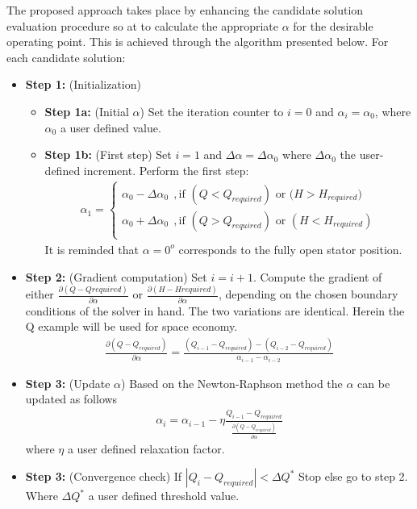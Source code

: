 The proposed approach takes place by enhancing the candidate solution evaluation procedure so at to calculate the appropriate $\alpha$ for the desirable operating point. This is achieved through the algorithm presented below. 
\newpage
For each candidate solution:
\begin{itemize}
\item[]{\bf Step 1:}  (Initialization) 
\begin{itemize}
	\item[]{\bf Step 1a:} (Initial $\alpha$) Set the iteration counter to $i=0$ and $\alpha_i=\alpha _0$, where $\alpha _0$ a user defined value.
	\item[]{\bf Step 1b:} (First step) Set $i=1$ and $\Delta \alpha= \Delta \alpha_0$ where $\Delta \alpha_0$ the user-defined increment. Perform the first step:
\begin{eqnarray}
	\alpha_1={\left\{ 
	\begin{array}{ll}
    \alpha_0 - \Delta \alpha_0 ~~,\mbox{if $(Q < Q_{required})$ or ($H > H_{required})$}\\
	\alpha_0 + \Delta \alpha_0 ~~,\mbox{if $(Q > Q_{required})$ or $(H < H_{required})$}\\
    \end{array} \right. }
    \label{step0}
\end{eqnarray}  
It is reminded that $\alpha=0^o$ corresponds to the fully open stator position.
\end{itemize}

\item[]{\bf Step 2:}  (Gradient computation) Set $i=i+1$. Compute the gradient of either $\frac{\partial(Q-Q{required})}{\partial \alpha}$ or $\frac{\partial(H-H{required})}{\partial \alpha}$, depending on the chosen boundary conditions of the solver in hand. The two variations are identical. Herein the Q example will be used for space economy. 
\begin{eqnarray}
	\frac{\partial(Q-Q_{required})}{\partial \alpha}=\frac{(Q_{i-1}-Q_{required})-(Q_{i-2}-Q_{required})}{\alpha_{i-1}- \alpha_{i-2}}
\end{eqnarray}  

\item[]{\bf Step 3:}  (Update $\alpha$) Based on the Newton-Raphson method the $\alpha$ can be updated as follows
\begin{eqnarray}
	\alpha_{i}=\alpha_{i-1} - \eta \frac{Q_{i-1}-Q_{required}} {\frac{\partial(Q-Q_{required})}{\partial \alpha}}  
\end{eqnarray}  
where $\eta$ a user defined relaxation factor. 

\item[]{\bf Step 3:} (Convergence check) If $|Q_{i}-Q_{required}|<\Delta Q^*$ Stop else go to step 2. Where $\Delta Q^*$ a user defined threshold value.
\end{itemize}  

